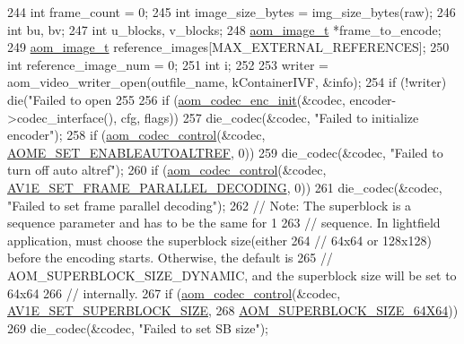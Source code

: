 \begin{DoxyCodeInclude}
{{{{244   \textcolor{keywordtype}{int} frame\_count = 0;
245   \textcolor{keywordtype}{int} image\_size\_bytes = img\_size\_bytes(raw);
246   \textcolor{keywordtype}{int} bu, bv;
247   \textcolor{keywordtype}{int} u\_blocks, v\_blocks;
248   \hyperlink{structaom__image}{aom\_image\_t} *frame\_to\_encode;
249   \hyperlink{structaom__image}{aom\_image\_t} reference\_images[MAX\_EXTERNAL\_REFERENCES];
250   \textcolor{keywordtype}{int} reference\_image\_num = 0;
251   \textcolor{keywordtype}{int} i;
252 
253   writer = aom\_video\_writer\_open(outfile\_name, kContainerIVF, &info);
254   \textcolor{keywordflow}{if} (!writer) die(\textcolor{stringliteral}{"Failed to open %
255 
256   \textcolor{keywordflow}{if} (\hyperlink{group__encoder_gaade68a7d33d30f97dc9a596aa5e065d8}{aom\_codec\_enc\_init}(&codec, encoder->codec\_interface(), cfg, flags))
257     die\_codec(&codec, \textcolor{stringliteral}{"Failed to initialize encoder"});
258   \textcolor{keywordflow}{if} (\hyperlink{group__codec_ga6da974f4eeaba1fa74106b28d0fe6ac5}{aom\_codec\_control}(&codec, \hyperlink{group__aom__encoder_ggae78dde67a6d78f332e9bdba0dde42db5ac8a24393f214823f5a6bd345afb840b6}{AOME\_SET\_ENABLEAUTOALTREF}, 0))
259     die\_codec(&codec, \textcolor{stringliteral}{"Failed to turn off auto altref"});
260   \textcolor{keywordflow}{if} (\hyperlink{group__codec_ga6da974f4eeaba1fa74106b28d0fe6ac5}{aom\_codec\_control}(&codec, 
      \hyperlink{group__aom__encoder_ggae78dde67a6d78f332e9bdba0dde42db5a465382b6bbca24467739c3c1b94e6483}{AV1E\_SET\_FRAME\_PARALLEL\_DECODING}, 0))
261     die\_codec(&codec, \textcolor{stringliteral}{"Failed to set frame parallel decoding"});
262   \textcolor{comment}{// Note: The superblock is a sequence parameter and has to be the same for 1}
263   \textcolor{comment}{// sequence. In lightfield application, must choose the superblock size(either}
264   \textcolor{comment}{// 64x64 or 128x128) before the encoding starts. Otherwise, the default is}
265   \textcolor{comment}{// AOM\_SUPERBLOCK\_SIZE\_DYNAMIC, and the superblock size will be set to 64x64}
266   \textcolor{comment}{// internally.}
267   \textcolor{keywordflow}{if} (\hyperlink{group__codec_ga6da974f4eeaba1fa74106b28d0fe6ac5}{aom\_codec\_control}(&codec, \hyperlink{group__aom__encoder_ggae78dde67a6d78f332e9bdba0dde42db5a8854a06c62269e866d6bac0f3a2e3dc2}{AV1E\_SET\_SUPERBLOCK\_SIZE},
268                         \hyperlink{group__codec_ggac34a24f7c6c0fef7518aed0da4425f61a5abd24080a18d4f7e33217d93a73e968}{AOM\_SUPERBLOCK\_SIZE\_64X64}))
269     die\_codec(&codec, \textcolor{stringliteral}{"Failed to set SB size"});
}}}}}
\end{DoxyCodeInclude}
